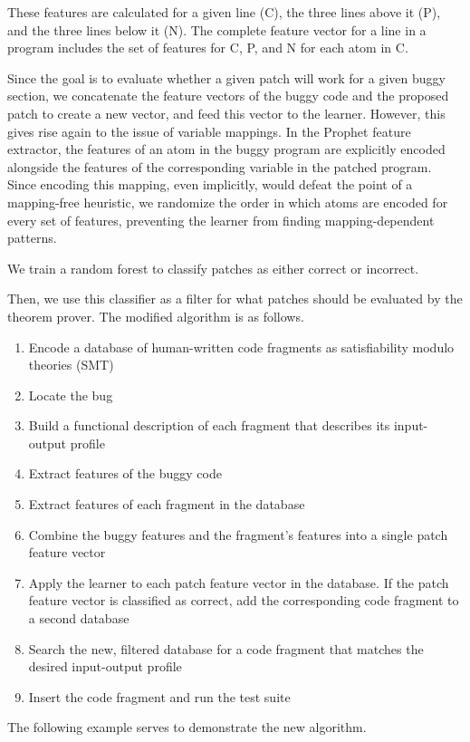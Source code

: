 \documentclass{paper}
\begin{document}
These features are calculated for a given line (C), the three lines above it (P), and the three lines below it (N). 
The complete feature vector for a line in a program includes the set of features for C, P, and N for each atom in C. 

Since the goal is to evaluate whether a given patch will work for a given buggy section, we concatenate the feature vectors of the buggy code and the proposed patch to create a new vector, and feed this vector to the learner. 
However, this gives rise again to the issue of variable mappings. 
In the Prophet feature extractor, the features of an atom in the buggy program are explicitly encoded alongside the features of the corresponding variable in the patched program. 
Since encoding this mapping, even implicitly, would defeat the point of a mapping-free heuristic, we randomize the order in which atoms are encoded for every set of features, preventing the learner from finding mapping-dependent patterns. 
 
We train a random forest to classify patches as either correct or incorrect. 

Then, we use this classifier as a filter for what patches should be evaluated by the theorem prover. 
The modified algorithm is as follows.
\begin{enumerate}
\item Encode a database of human-written code fragments as satisfiability modulo theories (SMT)
\item Locate the bug
\item Build a functional description of each fragment that describes its input-output profile
\item Extract features of the buggy code
\item Extract features of each fragment in the database
\item Combine the buggy features and the fragment's features into a single patch feature vector
\item Apply the learner to each patch feature vector in the database. If the patch feature vector is classified as correct, add the corresponding code fragment to a second database
\item Search the new, filtered database for a code fragment that matches the desired input-output profile
\item Insert the code fragment and run the test suite 
\end{enumerate}


The following example serves to demonstrate the new algorithm. 
\end{document}
